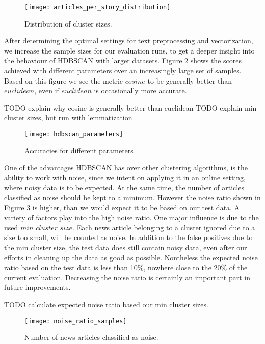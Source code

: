 \begin{figure}[h]
    \centering
    \texttt{[image: articles\_per\_story\_distribution]}
    \caption{Distribution of cluster sizes.}
    \label{fig:articles_per_story_distribution}
\end{figure}

After determining the optimal settings for text preprocessing and vectorization, we increase the sample sizes for our evaluation runs, to get a deeper insight into the behaviour of HDBSCAN with larger datasets. Figure \ref{fig:hdbscan_parameters} shows the scores achieved with different parameters over an increasingly large set of samples. Based on this figure we see the metric $cosine$ to be generally better than $euclidean$, even if $euclidean$ is occasionally more accurate.

TODO explain why cosine is generally better than euclidean
TODO explain min cluster sizes, but run with lemmatization

\begin{figure}[h]
    \centering
    \texttt{[image: hdbscan\_parameters]}
    \caption{Accuracies for different parameters}
    \label{fig:hdbscan_parameters}
\end{figure}

One of the advantages HDBSCAN has over other clustering algorithms, is the ability to work with noise, since we intent on applying it in an online setting, where noisy data is to be expected. At the same time, the number of articles classified as noise should be kept to a minimum. However the noise ratio shown in Figure \ref{fig:noise_ratio_samples} is higher, than we would expect it to be based on our test data. A variety of factors play into the high noise ratio. One major influence is due to the used $min\_cluster\_size$. Each news article belonging to a cluster ignored due to a size too small, will be counted as noise. In addition to the false positives due to the min cluster size, the test data does still contain noisy data, even after our efforts in cleaning up the data as good as possible. Nontheless the expected noise ratio based on the test data is less than 10\%, nowhere close to the 20\% of the current evaluation. Decreasing the noise ratio is certainly an important part in future improvements.

TODO calculate expected noise ratio based our min cluster sizes.


\begin{figure}[h]
    \centering
    \texttt{[image: noise\_ratio\_samples]}
    \caption{Number of news articles classified as noise.}
    \label{fig:noise_ratio_samples}
\end{figure}


